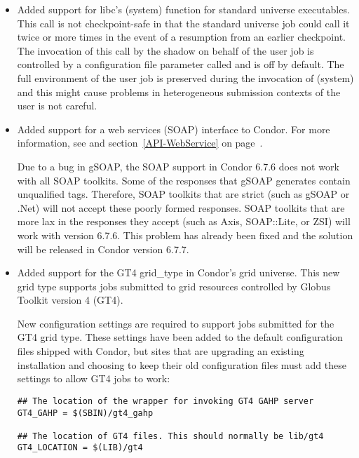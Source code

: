\begin{itemize}

\item Added support for libc's \Syscall(system) function for standard
        universe executables. This call is not checkpoint-safe in that
        the standard universe job could call it twice or more times
        in the event of a resumption from an earlier checkpoint. The
        invocation of this call by the shadow on behalf of the user
        job is controlled by a configuration file parameter called
         and is off by default.
        The full environment of the user job is preserved during the
        invocation of \Syscall(system) and this might cause problems in 
        heterogeneous submission contexts of the user is not careful.

\item Added support for a web services (SOAP) interface to Condor.
  For more information, see and section~\ref{API-WebService} on
  page~\pageref{API-WebService}.

  \Note Due to a bug in gSOAP, the SOAP support in Condor 6.7.6 does
  not work with all SOAP toolkits.
  Some of the responses that gSOAP generates contain unqualified tags.
  Therefore, SOAP toolkits that are strict (such as gSOAP or .Net)
  will not accept these poorly formed responses.
  SOAP toolkits that are more lax in the responses they accept (such
  as Axis, SOAP::Lite, or ZSI) will work with version 6.7.6.
  This problem has already been fixed and the solution will be
  released in Condor version 6.7.7.

\item Added support for the GT4 grid\_type in Condor's grid universe.
  This new grid type supports jobs submitted to grid resources
  controlled by Globus Toolkit version 4 (GT4).

  New configuration settings are required to support jobs
  submitted for the GT4 grid type.
  These settings have been added to the default configuration files
  shipped with Condor, but sites that are upgrading an existing
  installation and choosing to keep their old configuration files must
  add these settings to allow GT4 jobs to work:
\begin{verbatim}
## The location of the wrapper for invoking GT4 GAHP server
GT4_GAHP = $(SBIN)/gt4_gahp
 
## The location of GT4 files. This should normally be lib/gt4
GT4_LOCATION = $(LIB)/gt4


\end{verbatim}
\end{itemize}
